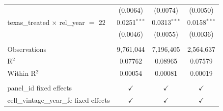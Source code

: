 \begin{tabular}{lccc}
                                                & (0.0064)              & (0.0074)               & (0.0050)\\   
   texas\_treated $\times$ rel\_year $=$ 22     & 0.0251$^{***}$        & 0.0313$^{***}$         & 0.0158$^{***}$\\   
                                                & (0.0046)              & (0.0055)               & (0.0036)\\   
    \\
   Observations                                 & 9,761,044             & 7,196,405              & 2,564,637\\  
   R$^2$                                        & 0.07762               & 0.08965                & 0.07579\\  
   Within R$^2$                                 & 0.00054               & 0.00081                & 0.00019\\  
    \\
   panel\_id fixed effects                      & $\checkmark$          & $\checkmark$           & $\checkmark$\\   
   cell\_vintage\_year\_fe fixed effects        & $\checkmark$          & $\checkmark$           & $\checkmark$\\   
   \bottomrule
\end{tabular}
\par\endgroup


